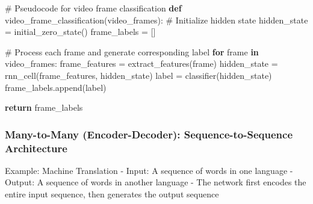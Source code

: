 \documentclass[
  letterpaper,
  DIV=11,
  numbers=noendperiod]{scrreprt}
\newenvironment{Shaded}{\begin{snugshade}}{\end{snugshade}}
\newcommand{\CommentTok}[1]{\textcolor[rgb]{0.37,0.37,0.37}{#1}}
\newcommand{\ControlFlowTok}[1]{\textcolor[rgb]{0.00,0.23,0.31}{\textbf{#1}}}
\newcommand{\KeywordTok}[1]{\textcolor[rgb]{0.00,0.23,0.31}{\textbf{#1}}}
\newcommand{\NormalTok}[1]{\textcolor[rgb]{0.00,0.23,0.31}{#1}}
\newcommand{\OperatorTok}[1]{\textcolor[rgb]{0.37,0.37,0.37}{#1}}
\begin{document}
\begin{Shaded}
\begin{Highlighting}[]
\CommentTok{\# Pseudocode for video frame classification}
\KeywordTok{def}\NormalTok{ video\_frame\_classification(video\_frames):}
    \CommentTok{\# Initialize hidden state}
\NormalTok{    hidden\_state }\OperatorTok{=}\NormalTok{ initial\_zero\_state()}
\NormalTok{    frame\_labels }\OperatorTok{=}\NormalTok{ []}
    
    \CommentTok{\# Process each frame and generate corresponding label}
    \ControlFlowTok{for}\NormalTok{ frame }\KeywordTok{in}\NormalTok{ video\_frames:}
\NormalTok{        frame\_features }\OperatorTok{=}\NormalTok{ extract\_features(frame)}
\NormalTok{        hidden\_state }\OperatorTok{=}\NormalTok{ rnn\_cell(frame\_features, hidden\_state)}
\NormalTok{        label }\OperatorTok{=}\NormalTok{ classifier(hidden\_state)}
\NormalTok{        frame\_labels.append(label)}
    
    \ControlFlowTok{return}\NormalTok{ frame\_labels}
\end{Highlighting}
\end{Shaded}

\subsubsection{Many-to-Many (Encoder-Decoder): Sequence-to-Sequence
Architecture}\label{many-to-many-encoder-decoder-sequence-to-sequence-architecture}

Example: Machine Translation - Input: A sequence of words in one
language - Output: A sequence of words in another language - The network
first encodes the entire input sequence, then generates the output
sequence
\end{document}
